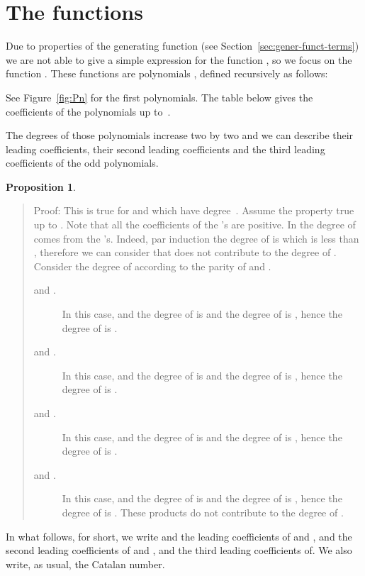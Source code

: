 \documentclass[preprint,authoryear]{elsarticle}
\newenvironment{proof}[1]{\begin{quotation}\noindent\textsf{Proof:} #1}{\end{quotation}}
\newtheorem{prop}{Proposition}
\begin{document}
\section{The functions }
\label{sec:m-Tnm}

Due to properties of the generating function (see Section~\ref{sec:gener-funct-terms}) we
are not able to give a simple expression for the function , so we focus on
the function .  These functions are
polynomials , defined recursively as follows:
\pagebreak[2]

See Figure~\ref{fig:Pn} for the first  polynomials.  
 The table below gives
the coefficients of the polynomials  up to~.

\begin{tiny}
  
\end{tiny}
The degrees of those polynomials
increase two by two and we can describe their leading coefficients,  their second leading
coefficients and the third leading coefficients of the odd polynomials.

\begin{prop}\label{prop:deg}

\end{prop}
\begin{proof}{}
  This is true for  and  which have degree~.  Assume the
  property true up to .  Note that all the coefficients of the 's are positive. In
 the degree of  comes
from the 's.  Indeed, par induction the degree of  is
 which is less than , therefore we can consider that 
does not contribute to the degree of . 
Consider the degree of 
according to the parity of  and .
\begin{description}
\item[ and .]  In this case,  and the degree of  is  and the
  degree of  is , hence the degree of  is .
\item[ and .] In this case,  and the degree of  is  and the
  degree of  is , hence the degree of  is .
\item[ and .] In this case,  and the degree of
   is  and the degree of  is , hence the degree
  of  is .
\item[ and .] In this case,  and the degree of
   is  and the degree of  is , hence the degree
  of  is .  These products   do not
  contribute to the degree of .
\end{description}

\end{proof}
In what follows, for short, we write  and  the leading coefficients of
 and ,  and  the second leading coefficients of
 and , and  the third leading coefficients
of.  We also write, as usual,  the  Catalan number.
\end{document}
